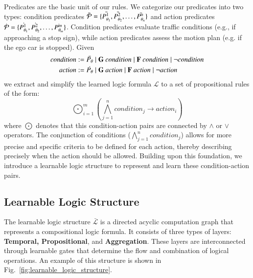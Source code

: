 Predicates are the basic unit of our rules. We categorize our predicates into two types: condition predicates $\bar{\mathcal{P}} = \{\bar{P^{1}_{\theta_1}}, \bar{P^{2}_{\theta_2}}, \ldots, \bar{P^{n}_{\theta_n}}\}$ and action predicates $\dot{\mathcal{P}} = \{\dot{P^{1}_{\theta_1}}, \dot{P^{2}_{\theta_2}}, \ldots, \dot{P^{m}_{\theta_m}}\}$. Condition predicates evaluate traffic conditions (e.g., if approaching a stop sign), while action predicates assess the motion plan (e.g. if the ego car is stopped). Given
\begin{equation}
    \begin{aligned}
        \mathit{condition} & := \bar{\Predicate} \mid \G\ condition \mid \F\ \mathit{condition} \mid \lnot \mathit{condition} \\
        \mathit{action}    & := \dot{\Predicate} \mid \G\ \mathit{action} \mid \F\ \mathit{action} \mid \lnot \mathit{action}
    \end{aligned}
\end{equation}
we extract and simplify the learned logic formula $\mathcal{L}$ to a set of propositional rules of the form:
\begin{equation}
    \label{eq:condition_action_pair}
    \bigodot_{i=1}^m \left(\bigwedge_{j=1}^n condition_j \rightarrow action_i\right)
\end{equation}
where $\bigodot$ denotes that this condition-action pairs are connected by $\land$ or $\lor$ operators. The conjunction of conditions ($\bigwedge_{j=1}^n condition_j$) allows for more precise and specific criteria to be defined for each action, thereby describing precisely when the action should be allowed. Building upon this foundation, we introduce a learnable logic structure to represent and learn these condition-action pairs.


\subsection{Learnable Logic Structure}
\label{sec:learnable_logic_structure}

The learnable logic structure $\bar{\mathcal{L}}$ is a directed acyclic computation graph that represents a compositional logic formula. It consists of three types of layers: \textbf{Temporal, Propositional}, and \textbf{Aggregation}. These layers are interconnected through learnable gates that determine the flow and combination of logical operations. An example of this structure is shown in Fig.~\ref{fig:learnable_logic_structure}.

